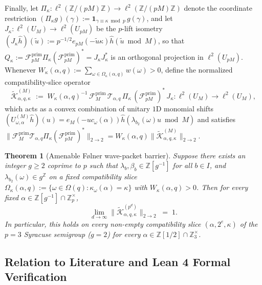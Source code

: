 \documentclass[11pt,a4paper]{article}
\numberwithin{equation}{section}
\newtheorem{theorem}{Theorem}[section]
\theoremstyle{definition}
\theoremstyle{remark}
\newcommand{\Z}{\mathbb{Z}}
\newcommand{\cF}{\mathcal{F}}
\newcommand{\cT}{\mathcal{T}}
\newcommand{\cK}{\mathcal{K}}
\newcommand{\prim}{\mathrm{prim}}
\begin{document}
Finally, let $\Pi_\kappa : \ell^2(\Z/(pM)\Z) \to \ell^2(\Z/(pM)\Z)$ denote the coordinate restriction $(\Pi_\kappa g)(\gamma) := \mathbf{1}_{\gamma \equiv \kappa \bmod p}\, g(\gamma)$, and let $J_\kappa : \ell^2(U_M) \to \ell^2(U_{pM})$ be the $p$-lift isometry $(J_\kappa \hat h)(\tilde u) := p^{-1/2} e_{pM}(-\tilde u \kappa)\hat h(\tilde u \bmod M)$, so that $Q_\kappa := \cF_{pM}^{\prim}\Pi_\kappa(\cF_{pM}^{\prim})^* = J_\kappa J_\kappa^*$ is an orthogonal projection in $\ell^2(U_{pM})$. Whenever $W_\kappa(\alpha, q) := \sum_{\omega \in \Omega_\kappa(\alpha, q)} w(\omega) > 0$, define the normalized compatibility-slice operator
\[
\widetilde{\cK}_{\alpha, q, \kappa}^{(M)} \;:=\; W_\kappa(\alpha, q)^{-1}\,\cF_M^{\prim}\,\cT_{\alpha, q}\,\Pi_\kappa\,(\cF_{pM}^{\prim})^*\, J_\kappa : \ell^2(U_M) \longrightarrow \ell^2(U_M),
\]
which acts as a convex combination of unitary $1$D monomial shifts $(U_{\omega, \alpha}^{(M)}\hat h)(u) = e_M(-u c_\omega(\alpha))\hat h(\lambda_{b_2}(\omega)u \bmod M)$ and satisfies $\|\cF_M^{\prim}\cT_{\alpha, q}\Pi_\kappa(\cF_{pM}^{\prim})^*\|_{2\to 2} = W_\kappa(\alpha, q)\|\widetilde{\cK}_{\alpha, q, \kappa}^{(M)}\|_{2\to 2}$.

\begin{theorem}[Amenable F{\o}lner wave-packet barrier]\label{thm:folner}
Suppose there exists an integer $g \ge 2$ coprime to $p$ such that $\lambda_b, \beta_b \in \Z[g^{-1}]$ for all $b \in I$, and $\lambda_{b_2}(\omega) \in g^\Z$ on a fixed compatibility slice $\Omega_\kappa(\alpha, q) := \{\omega \in \Omega(q) : \kappa_\omega(\alpha) = \kappa\}$ with $W_\kappa(\alpha, q) > 0$. Then for every fixed $\alpha \in \Z[g^{-1}] \cap \Z_p^\times$,
\[
\lim_{d \to \infty} \bigl\|\widetilde{\cK}_{\alpha, q, \kappa}^{(p^d)}\bigr\|_{2\to 2} \;=\; 1.
\]
In particular, this holds on every non-empty compatibility slice $(\alpha, 2^e, \kappa)$ of the $p=3$ Syracuse semigroup ($g = 2$) for every $\alpha \in \Z[1/2]\cap\Z_3^\times$.
\end{theorem}

\subsection{Relation to Literature and Lean 4 Formal Verification}\label{subsec:literature}
\end{document}
